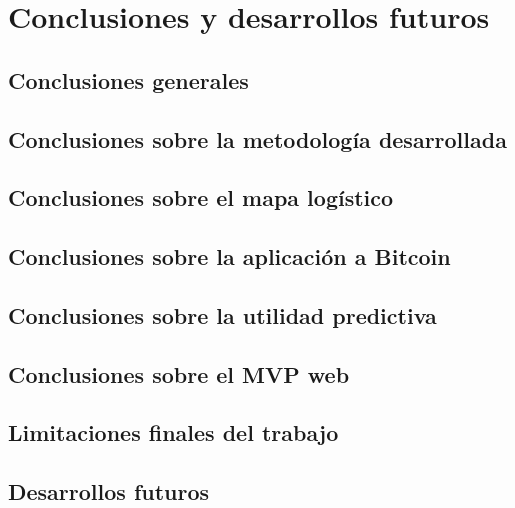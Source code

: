 
\chapter{Conclusiones y desarrollos futuros}\label{cap:conclusiones}

\section{Conclusiones generales}\label{sec:conclusiones-generales}

\section{Conclusiones sobre la metodología desarrollada}\label{sec:conclusiones-metodologia}

\section{Conclusiones sobre el mapa logístico}\label{sec:conclusiones-logistico}

\section{Conclusiones sobre la aplicación a Bitcoin}\label{sec:conclusiones-bitcoin}

\section{Conclusiones sobre la utilidad predictiva}\label{sec:conclusiones-predictiva}

\section{Conclusiones sobre el MVP web}\label{sec:conclusiones-mvp}

\section{Limitaciones finales del trabajo}\label{sec:limitaciones-finales}

\section{Desarrollos futuros}\label{sec:desarrollos-futuros}
